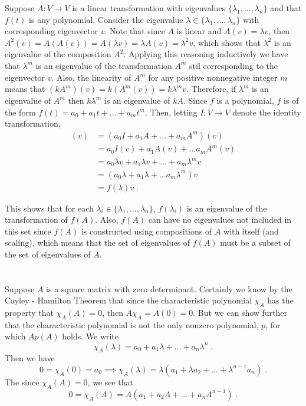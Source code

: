 \documentclass[11pt]{article}
\begin{document}
Suppose $A : V \rightarrow V$ is a linear transformation with eigenvalues $\{\lambda_1, ..., \lambda_n\}$ and that $f(t)$ is any polynomial. Consider the eigenvalue $\lambda \in \{\lambda_1, ..., \lambda_n\}$ with corresponding eigenvector $v$. Note that since $A$ is linear and $A(v) = \lambda v$, then $A^2(v) = A(A(v)) = A(\lambda v) = \lambda A(v) = \lambda^2 v$, which shows that $\lambda^2$ is an eigenvalue of the composition $A^2$. Applying this reasoning inductively we have that $\lambda^m$ is an eigenvalue of the transformation $A^m$ stil corresponding to the eigenvector $v$. Also, the linearity of $A^m$ for any positive nonnegative integer $m$ means that $(kA^m)(v) = k(A^m(v)) = k\lambda^m v$. Therefore, if $\lambda^m$ is an eigenvalue of $A^m$ then $k\lambda^m$ is an eigenvalue of $kA$. Since $f$ is a polynomial, $f$ is of the form $f(t) = a_0 + a_1t + ...+a_mt^m$. Then, letting $I : V \rightarrow V$ denote the identity transformation, 
\begin{align}
[f(A)](v) &= (a_0I + a_1A + ... +a_mA^m)(v) \\
&= a_0I(v) + a_1A(v) + ... a_mA^m(v) \\
&= a_0\lambda v + a_1 \lambda v + ... + a_m \lambda^m v\\
&= (a_0\lambda + a_1 \lambda + ...a_m \lambda^m )v \\
&= f(\lambda)v \;.
\end{align}

This shows that for each $\lambda_i \in \{\lambda_1,...,\lambda_n\}$, $f(\lambda_i)$ is an eigenvalue of the transformation of $f(A)$. Also, $f(A)$ can have no eigenvalues not included in this set since $f(A)$ is constructed using compositions of $A$ with itself (and scaling), which means that the set of eigenvalues of $f(A)$ must be a subset of the set of eigenvalues of $A$. 

\section{}

Suppose $A$ is a square matrix with zero determinant. Certainly we know by the Cayley - Hamilton Theorem that since the characteristic polynomial $\chi_A$ has the property that $\chi_A(A) = 0$, then $A \chi_A = A(0) = 0$. But we can show further that the characteristic polynomial is not the only nonzero polynomial, $p$, for which $Ap(A)$ holds. We write $$\chi_A(\lambda) = a_0 + a_1\lambda + ... + a_n\lambda^n\;.$$ Then we have $$0 = \chi_A(0) =  a_0 \implies \chi_A(\lambda) = \lambda(a_1 + \lambda a_2 + ... + \lambda^{n-1}a_n) \;.$$ The since $\chi_A(A) = 0$, we see that $$0 = \chi_A(A) = A(a_1 + a_2 A + ... + a_n A^{n-1}) \;.$$
\end{document}
